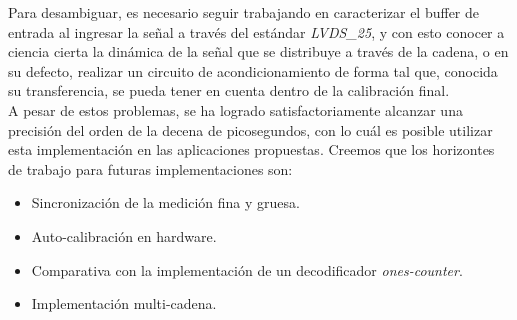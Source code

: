 Para desambiguar, es necesario seguir trabajando en caracterizar
el buffer de entrada al ingresar la señal a través del estándar \textit{LVDS\_25}, y con esto conocer a ciencia
cierta la dinámica de la señal que se distribuye a través de la cadena, o en su defecto, realizar un circuito 
de acondicionamiento de forma tal que, conocida su transferencia, se pueda tener en cuenta dentro de la calibración
final.\\
A pesar de estos problemas, se ha logrado satisfactoriamente alcanzar una precisión del orden de la decena de picosegundos,
con lo cuál es posible utilizar esta implementación en las aplicaciones propuestas. Creemos que los horizontes de trabajo para futuras
implementaciones son:
\begin{itemize}
     \item Sincronización de la medición fina y gruesa.
     \item Auto-calibración en hardware.
     \item Comparativa con la implementación de un decodificador \textit{ones-counter}.
     \item Implementación multi-cadena.
\end{itemize}
